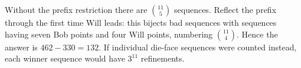 Without the prefix restriction there are $\binom{11}{5}$ sequences. Reflect the prefix through the first time Will leads: this bijects bad sequences with sequences having seven Bob points and four Will points, numbering $\binom{11}{4}$. Hence the answer is $462-330=\boxed{132}$. If individual die-face sequences were counted instead, each winner sequence would have $3^{11}$ refinements.

